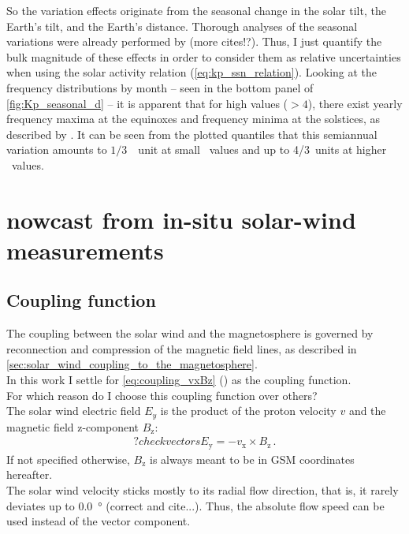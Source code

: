 So the \Kp{} variation effects originate from the seasonal change in the solar tilt, the Earth's tilt, and the Earth's distance. Thorough analyses of the seasonal variations were already performed by \citep{Cortie1912} (more cites!?). Thus, I just quantify the bulk magnitude of these effects in order to consider them as relative uncertainties when using the solar activity relation (\ref{eq:kp_ssn_relation}). Looking at the \Kp{} frequency distributions by month -- seen in the bottom panel of \autoref{fig:Kp_seasonal_d} -- it is apparent that for high \Kp{} values ($>4$), there exist yearly frequency maxima at the equinoxes and frequency minima at the solstices, as described by \citep{Cortie1912}. It can be seen from the plotted quantiles that this semiannual variation amounts to $1/3$~\Kp~unit at small \Kp~values and up to 4/3~units at higher \Kp~values.


\section{\Kp{} nowcast from in-situ solar-wind measurements}
\label{sec:kp_nowcast}

\subsection{Coupling function}

The coupling between the solar wind and the magnetosphere is governed by reconnection and compression of the magnetic field lines, as described in \autoref{sec:solar_wind_coupling_to_the_magnetosphere}.\\

In this work I settle for \autoref{eq:coupling_vxBz} (\vBz{}) as the coupling function.\\
For which reason do I choose this coupling function over others?\\

The solar wind electric field $E_y$ is the product of the proton velocity $v$ and the magnetic field z-component $B_\text{z}$:
\begin{align}
	?check vectors  E_\text{y} = -v_\text{x} \times B_\text{z}\,.
\end{align}
If not specified otherwise, $B_\text{z}$ is always meant to be in GSM coordinates hereafter.\\


The solar wind velocity sticks mostly to its radial flow direction, that is, it rarely deviates up to \SI{0.0}{\degree} (correct and cite...). Thus, the absolute flow speed can be used instead of the vector component.\\

